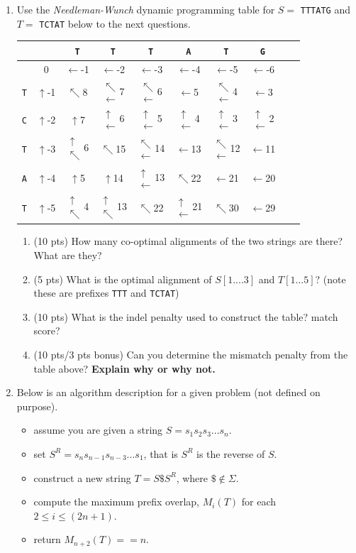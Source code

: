 \documentclass[11pt, oneside]{article}   	%
\newcommand{\diru}{$\uparrow$}
\newcommand{\dirl}{$\leftarrow$}
\newcommand{\dird}{$\nwarrow$}
\newcommand{\dirdl}{$\substack{\nwarrow\\\leftarrow}$}
\newcommand{\dirdu}{$\substack{\uparrow\\\nwarrow}$}
\newcommand{\dirlu}{$\substack{\uparrow\\\leftarrow}$}
\begin{document}
\clearpage
\begin{enumerate}
\item Use the \textit{Needleman-Wunch} dynamic programming table for $S = $ \texttt{TTTATG} and $T = $ \texttt{TCTAT} below to the next questions.
%
\renewcommand{\arraystretch}{2}
\begin{center}
{\footnotesize
\begin{tabular}{|c||c|c|c|c|c|c|c|c|c|}
\hline
& & \texttt{T} &  \texttt{T} &  \texttt{T} &  \texttt{A} &  \texttt{T} &  \texttt{G}\\
\hline
\hline
&  0 &	  \dirl -1 &	 \dirl  -2 &	\dirl -3 &	\dirl -4 &	\dirl -5 &	\dirl -6  \\[1ex]
\hline
\texttt{T} &  \diru -1 &	 \dird 8  &	 \dirdl 7 &	\dirdl 6 &	\dirl 5 &	\dirdl 4 &		\dirl 3  \\[1ex]
\hline 
\texttt{C} &  \diru -2 & 	\diru 7 & 	 \dirlu 6 &    \dirlu 5 & \dirlu 4 &		\dirlu 3 &	\dirlu 2 \\[1ex]
\hline
\texttt{T} &  \diru -3 & 	\dirdu 6 & \dird 15 & \dirdl 14 &  \dirl 13 & \dirdl 12 & \dirl 11 \\[1ex]
\hline 
\texttt{A} &  \diru -4 & \diru 5 & \diru 14 & \dirlu 13 &   \dird 22 & \dirl 21 & \dirl 20  \\[1ex]
\hline 
\texttt{T} &  \diru -5 & \dirdu 4 & \dirdu 13 & \dird 22 &   \dirlu 21 & \dird 30 & \dirl 29  \\[1ex]\hline 
\end{tabular}
}
\end{center}
\begin{enumerate}
\item (10 pts) How many co-optimal alignments of the two strings are there? What are they? 
\item (5 pts) What is the optimal alignment of $S[1....3]$ and $T[1...5]$? (note these are prefixes \texttt{TTT} and \texttt{TCTAT})
\item (10 pts) What is the indel penalty used to construct the table? match score?
\item \dag (10 pts/3 pts bonus) Can you determine the mismatch penalty from the table above? \textbf{Explain why or why not.}
\end{enumerate}

\clearpage 

\item Below is an algorithm description for a given problem (not defined on purpose). 

\begin{itemize}
\item assume you are given a string $S=s_1s_2s_3...s_n$.
\item set $S^R = s_ns_{n-1}s_{n-3}...s_1$, that is $S^R$ is the reverse of $S$.
\item construct a new string $T=S\$S^R$, where $\$\notin\Sigma$. 
\item compute the maximum prefix overlap, $M_i(T)$ for each $2 \le i \le (2n+1)$.
\item return $M_{n+2}(T) == n$.
\end{itemize}



\end{enumerate}
\end{document}
